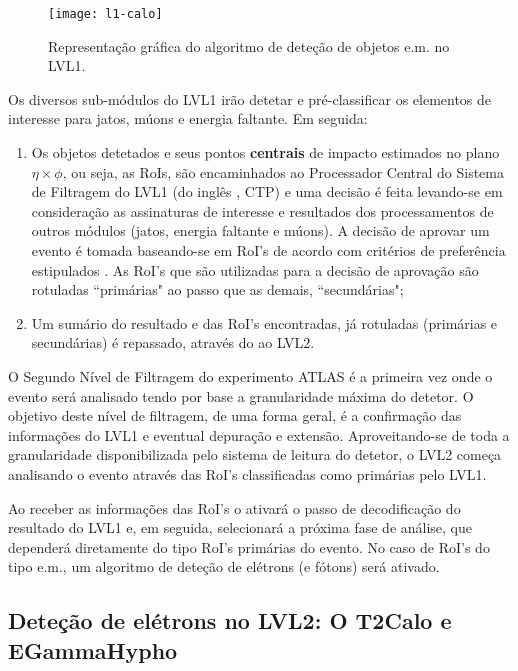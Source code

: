 \begin{figure}
\begin{center}
\texttt{[image: l1-calo]}
\end{center}
\caption{Representação gráfica do algoritmo de deteção de objetos e.m. no LVL1.}
\label{fig:l1-calo}
\end{figure}

Os diversos sub-módulos do LVL1 irão detetar e pré-classificar os elementos de
interesse para jatos, múons e energia faltante. Em seguida:

\begin{enumerate}
\item Os objetos detetados e seus pontos \textbf{centrais} de impacto
estimados no plano $\eta\times\phi$, ou seja, as RoIs, são encaminhados ao
Processador Central do Sistema de Filtragem do LVL1 (do inglês , CTP) e uma decisão é feita levando-se em consideração as
assinaturas de interesse e resultados dos processamentos de outros módulos
(jatos, energia faltante e múons). A decisão de aprovar um evento é tomada
baseando-se em RoI's de acordo com critérios de preferência estipulados . As RoI's que são utilizadas para a decisão de aprovação são rotuladas
``primárias" ao passo que as demais, ``secundárias";

\item Um sumário do resultado e das RoI's encontradas, já rotuladas (primárias
e secundárias) é repassado, através do  ao LVL2.
\end{enumerate}

O Segundo Nível de Filtragem do experimento ATLAS é a primeira vez onde o
evento será analisado tendo por base a granularidade máxima do detetor. O
objetivo deste nível de filtragem, de uma forma geral, é a confirmação das
informações do LVL1 e eventual depuração e extensão. Aproveitando-se de toda
a granularidade disponibilizada pelo sistema de leitura do detetor, o LVL2
começa analisando o evento através das RoI's classificadas como primárias pelo
LVL1.

Ao receber as informações das RoI's o  ativará o passo de
decodificação do resultado do LVL1 e, em seguida, selecionará a próxima fase
de análise, que dependerá diretamente do tipo RoI's primárias do evento. No
caso de RoI's do tipo e.m., um algoritmo de deteção de elétrons (e fótons)
será ativado.

\subsection{Deteção de elétrons no LVL2: O T2Calo e EGammaHypho}
\label{sec:classic-detection}

